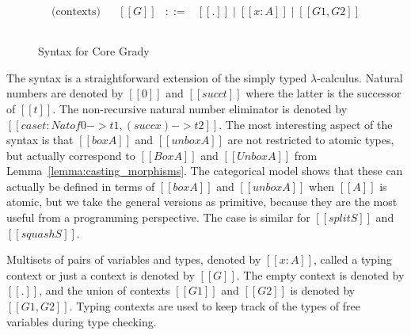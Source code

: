 \begin{figure}
\begin{mdframed}
\[\begin{array}{cl}
        \begin{array}{lll}
          \text{(contexts)}\\
        \end{array}  &
        \begin{array}{lcl}
          [[G]] & ::= & [[.]] \mid [[x : A]] \mid [[G1,G2]]\\
        \end{array}\\
      \end{array}
      \]    
  \end{mdframed}
  \caption{Syntax for Core Grady}
  \label{fig:syntax-core-grady}
\end{figure}
The syntax is a straightforward extension of the simply typed
$\lambda$-calculus.  Natural numbers are denoted by $[[0]]$ and
$[[succ t]]$ where the latter is the successor of $[[t]]$.  The
non-recursive natural number eliminator is denoted by $[[case t : Nat
    of 0 -> t1, (succ x) -> t2]]$.  The most interesting aspect of the
syntax is that $[[box A]]$ and $[[unbox A]]$ are not restricted to
atomic types, but actually correspond to $[[Box A]]$ and $[[Unbox A]]$
from Lemma~\ref{lemma:casting_morphisms}.  The categorical model shows
that these can actually be defined in terms of $[[box A]]$ and
$[[unbox A]]$ when $[[A]]$ is atomic, but we take the general versions
as primitive, because they are the most useful from a programming
perspective.  The case is similar for $[[split S]]$ and $[[squash
    S]]$.

Multisets of pairs of variables and types, denoted by $[[x : A]]$,
called a typing context or just a context is denoted by $[[G]]$.  The
empty context is denoted by $[[.]]$, and the union of contexts
$[[G1]]$ and $[[G2]]$ is denoted by $[[G1,G2]]$.  Typing contexts are
used to keep track of the types of free variables during type
checking.

